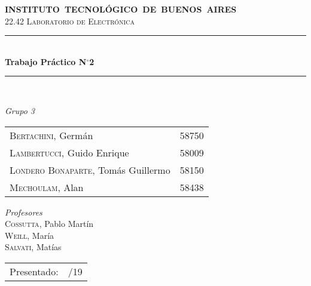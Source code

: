 \begin{titlepage}

\newcommand{\HRule}{\rule{\linewidth}{0.5mm}}
\center
\mbox{\textsc{\large \bfseries {INSTITUTO TECNOLÓGICO DE BUENOS AIRES}}}\\[1cm]
\textsc{\Large 22.42 Laboratorio de Electrónica}\\[0.5cm]


\HRule \\[0.6cm]
{ \Huge \bfseries Trabajo Práctico N$^{\circ}$2}\\[0.4cm] 
\HRule \\[1.5cm]


{\large

\emph{Grupo 3}\\
\vspace{3px}

\begin{tabular}{lr} 	
\textsc{Bertachini}, Germán  & 58750 \\ 	
\textsc{Lambertucci}, Guido Enrique  & 58009 \\
\textsc{Londero Bonaparte}, Tomás Guillermo  & 58150 \\
\textsc{Mechoulam}, Alan  &  58438\\
\end{tabular}

\vspace{20px}

\emph{Profesores}\\
\vspace{3px}
\textsc{Cossutta}, Pablo Martín\\
\textsc{Weill}, María\\
\textsc{Salvati}, Matías\\	

\vspace{100px}

\begin{tabular}{ll}

Presentado: & /19\\

\end{tabular}

}

\vfill

\end{titlepage}

